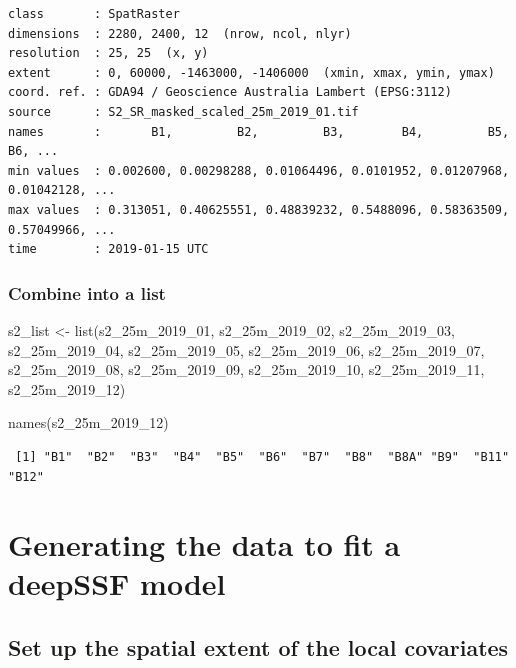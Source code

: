 \documentclass[
  letterpaper,
  DIV=11,
  numbers=noendperiod]{scrartcl}
\newenvironment{Shaded}{\begin{snugshade}}{\end{snugshade}}
\newcommand{\FunctionTok}[1]{\textcolor[rgb]{0.28,0.35,0.67}{#1}}
\newcommand{\NormalTok}[1]{\textcolor[rgb]{0.00,0.23,0.31}{#1}}
\newcommand{\OtherTok}[1]{\textcolor[rgb]{0.00,0.23,0.31}{#1}}
\begin{document}
\begin{verbatim}
class       : SpatRaster 
dimensions  : 2280, 2400, 12  (nrow, ncol, nlyr)
resolution  : 25, 25  (x, y)
extent      : 0, 60000, -1463000, -1406000  (xmin, xmax, ymin, ymax)
coord. ref. : GDA94 / Geoscience Australia Lambert (EPSG:3112) 
source      : S2_SR_masked_scaled_25m_2019_01.tif 
names       :       B1,         B2,         B3,        B4,         B5,         B6, ... 
min values  : 0.002600, 0.00298288, 0.01064496, 0.0101952, 0.01207968, 0.01042128, ... 
max values  : 0.313051, 0.40625551, 0.48839232, 0.5488096, 0.58363509, 0.57049966, ... 
time        : 2019-01-15 UTC 
\end{verbatim}

\subsubsection{Combine into a list}\label{combine-into-a-list}

\begin{Shaded}
\begin{Highlighting}[]
\NormalTok{s2\_list }\OtherTok{\textless{}{-}} \FunctionTok{list}\NormalTok{(s2\_25m\_2019\_01, }
\NormalTok{                s2\_25m\_2019\_02, }
\NormalTok{                s2\_25m\_2019\_03, }
\NormalTok{                s2\_25m\_2019\_04, }
\NormalTok{                s2\_25m\_2019\_05, }
\NormalTok{                s2\_25m\_2019\_06, }
\NormalTok{                s2\_25m\_2019\_07, }
\NormalTok{                s2\_25m\_2019\_08, }
\NormalTok{                s2\_25m\_2019\_09, }
\NormalTok{                s2\_25m\_2019\_10, }
\NormalTok{                s2\_25m\_2019\_11, }
\NormalTok{                s2\_25m\_2019\_12)}

\FunctionTok{names}\NormalTok{(s2\_25m\_2019\_12)}
\end{Highlighting}
\end{Shaded}

\begin{verbatim}
 [1] "B1"  "B2"  "B3"  "B4"  "B5"  "B6"  "B7"  "B8"  "B8A" "B9"  "B11" "B12"
\end{verbatim}

\section{Generating the data to fit a deepSSF
model}\label{generating-the-data-to-fit-a-deepssf-model}

\subsection{Set up the spatial extent of the local
covariates}\label{set-up-the-spatial-extent-of-the-local-covariates}
\end{document}
